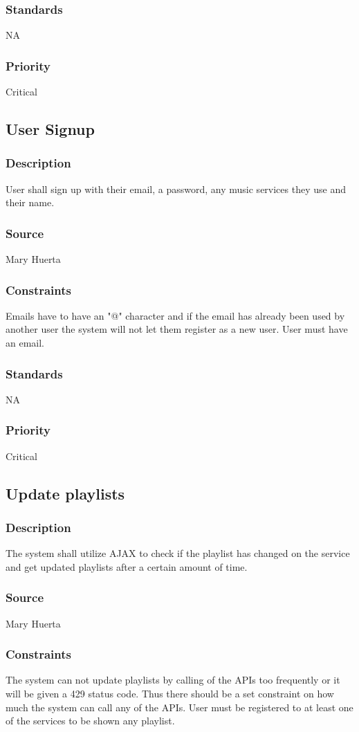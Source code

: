 \subsubsection{Standards}
NA
\subsubsection{Priority}
Critical


\subsection{User Signup}
\subsubsection{Description}
User shall sign up with their email, a password, any music services they use and their name.
\subsubsection{Source}
Mary Huerta
\subsubsection{Constraints}
Emails have to have an "@" character and if the email has already been used by another user the system will not let them register as a new user. User must have an email.
\subsubsection{Standards}
NA
\subsubsection{Priority}
Critical


\subsection{Update playlists}
\subsubsection{Description}
The system shall utilize AJAX to check if the playlist has changed on the service and get updated playlists after a certain amount of time.
\subsubsection{Source}
Mary Huerta
\subsubsection{Constraints}
The system can not update playlists by calling of the APIs too frequently or it will be given a 429 status code. Thus there should be a set constraint on how much the system can call any of the APIs. User must be registered to at least one of the services to be shown any playlist.
